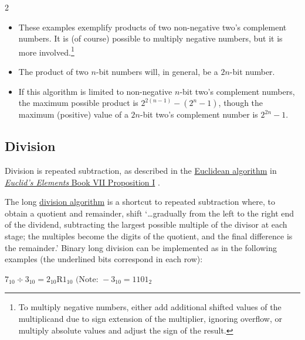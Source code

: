 \documentclass[11pt]{article}%
\begin{document}
\begin{multicols}{2}
\begin{itemize}
\item These examples exemplify products of two non-negative two's complement numbers. It is (of course) possible to multiply negative numbers, but it is more involved.\footnote{To multiply negative numbers, either add additional shifted values of the multiplicand due to sign extension of the multiplier, ignoring overflow, or multiply absolute values and adjust the sign of the result. }
\item The product of two $n$-bit numbers will, in general, be a $2n$-bit number.\item If this algorithm is limited to non-negative $n$-bit two's complement numbers, the maximum possible product is $2^{2\left(n - 1\right)} - \left( 2^{n} - 1 \right)$, though the maximum (positive) value of a $2n$-bit two's complement number is $2^{2n} - 1$.
\end{itemize}

\subsection{Division}
\label{Division}

Division is repeated subtraction, as described in the \href{https://en.wikipedia.org/wiki/Euclidean_division}{Euclidean algorithm} in \href{https://mathcs.clarku.edu/~djoyce/java/elements/bookVII/propVII1.html}{\textit{Euclid's Elements} Book VII Proposition I} \parencite{book:elements-one-volume}.

The long \href{https://en.wikipedia.org/wiki/Division_algorithm#Integer_division_(unsigned)_with_remainder}{division algorithm} is a shortcut to repeated subtraction where, to obtain a quotient and remainder, shift `\dots gradually from the left to the right end of the dividend, subtracting the largest possible multiple of the divisor at each stage; the multiples become the digits of the quotient, and the final difference is the remainder.' \parencite{wiki:division-algorithm} Binary long division can be implemented as in the following examples (the underlined bits correspond in each row):

\begin{minipage}{\linewidth}
$7_{10} \div 3_{10} = 2_{10}\text{R}1_{10}\text{ (Note: }-3_{10} = 1101_{2}$\text{)}


\end{minipage}
\end{multicols}
\end{document}
